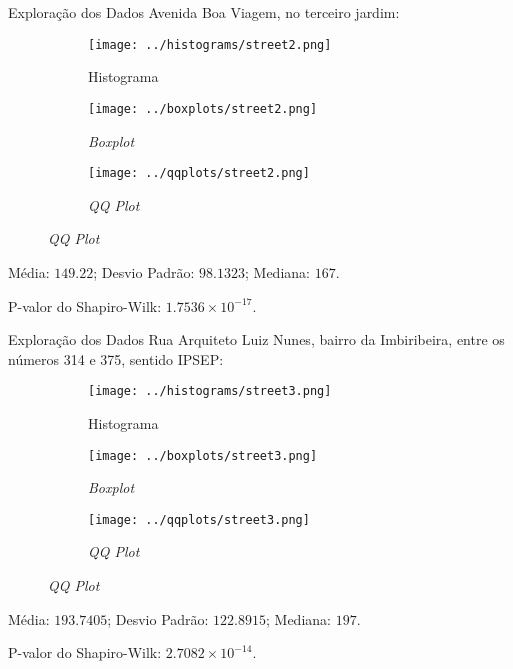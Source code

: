 \begin{frame}{Exploração dos Dados}
Avenida Boa Viagem, no terceiro jardim:
\vskip 0.05cm
\begin{figure}
	\centering
	\begin{subfigure}{.33\textwidth}
		\centering
		\texttt{[image: ../histograms/street2.png]}
		\caption*{Histograma}
	\end{subfigure}%
	\begin{subfigure}{.33\textwidth}
		\centering
		\texttt{[image: ../boxplots/street2.png]}
		\caption*{\textit{Boxplot}}
	\end{subfigure}
	\begin{subfigure}{.32\textwidth}
		\centering
		\texttt{[image: ../qqplots/street2.png]}
		\caption*{\textit{QQ Plot}}
	\end{subfigure}
\end{figure}
\vskip 0.05cm
Média: $149.22$; Desvio Padrão: $98.1323$; Mediana: $167$.

P-valor do Shapiro-Wilk: $1.7536 \times 10^{-17}$.
\end{frame}

\begin{frame}{Exploração dos Dados}
Rua Arquiteto Luiz Nunes, bairro da Imbiribeira, entre os números 314 e 375,
sentido IPSEP:
\begin{figure}
	\centering
	\begin{subfigure}{.33\textwidth}
		\centering
		\texttt{[image: ../histograms/street3.png]}
		\caption*{Histograma}
	\end{subfigure}%
	\begin{subfigure}{.33\textwidth}
		\centering
		\texttt{[image: ../boxplots/street3.png]}
		\caption*{\textit{Boxplot}}
	\end{subfigure}
	\begin{subfigure}{.32\textwidth}
		\centering
		\texttt{[image: ../qqplots/street3.png]}
		\caption*{\textit{QQ Plot}}
	\end{subfigure}
\end{figure}
Média: $193.7405$; Desvio Padrão: $122.8915$; Mediana: $197$.

P-valor do Shapiro-Wilk: $2.7082 \times 10^{-14}$.
\end{frame}

